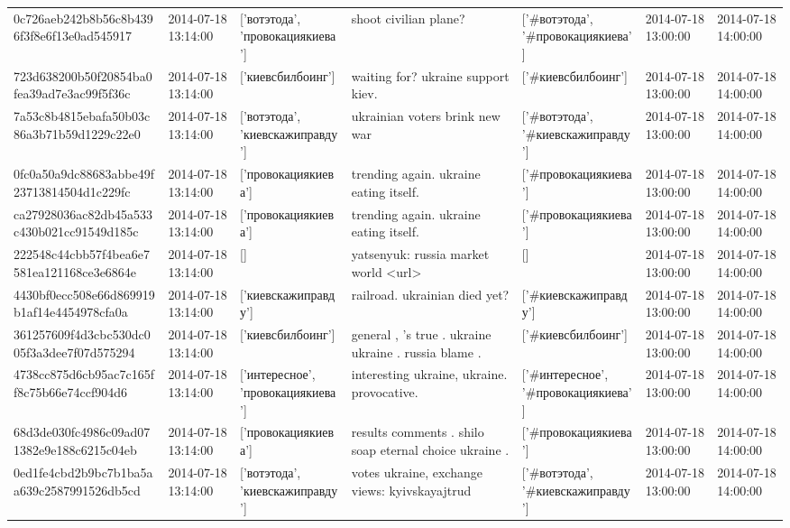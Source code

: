 \begin{tabular}{lllllll}
0c726aeb242b8b56c8b4396f3f8e6f13e0ad545917 & 2014-07-18 13:14:00 & ['вотэтода', 'провокациякиева'] & shoot civilian plane? & ['#вотэтода', '#провокациякиева'] & 2014-07-18 13:00:00 & 2014-07-18 14:00:00 \\
723d638200b50f20854ba0fea39ad7e3ac99f5f36c & 2014-07-18 13:14:00 & ['киевсбилбоинг'] & waiting for? ukraine support kiev. & ['#киевсбилбоинг'] & 2014-07-18 13:00:00 & 2014-07-18 14:00:00 \\
7a53c8b4815ebafa50b03c86a3b71b59d1229c22e0 & 2014-07-18 13:14:00 & ['вотэтода', 'киевскажиправду'] & ukrainian voters brink new war & ['#вотэтода', '#киевскажиправду'] & 2014-07-18 13:00:00 & 2014-07-18 14:00:00 \\
0fc0a50a9dc88683abbe49f23713814504d1c229fc & 2014-07-18 13:14:00 & ['провокациякиева'] & trending again. ukraine eating itself. & ['#провокациякиева'] & 2014-07-18 13:00:00 & 2014-07-18 14:00:00 \\
ca27928036ac82db45a533c430b021cc91549d185c & 2014-07-18 13:14:00 & ['провокациякиева'] & trending again. ukraine eating itself. & ['#провокациякиева'] & 2014-07-18 13:00:00 & 2014-07-18 14:00:00 \\
222548c44cbb57f4bea6e7581ea121168ce3e6864e & 2014-07-18 13:14:00 & [] & yatsenyuk: russia market world <url> & [] & 2014-07-18 13:00:00 & 2014-07-18 14:00:00 \\
4430bf0ecc508e66d869919b1af14e4454978cfa0a & 2014-07-18 13:14:00 & ['киевскажиправду'] & railroad. ukrainian died yet? & ['#киевскажиправду'] & 2014-07-18 13:00:00 & 2014-07-18 14:00:00 \\
361257609f4d3cbc530dc005f3a3dee7f07d575294 & 2014-07-18 13:14:00 & ['киевсбилбоинг'] & general , 's true . ukraine ukraine . russia blame . & ['#киевсбилбоинг'] & 2014-07-18 13:00:00 & 2014-07-18 14:00:00 \\
4738cc875d6cb95ac7c165ff8c75b66e74ccf904d6 & 2014-07-18 13:14:00 & ['интересное', 'провокациякиева'] & interesting ukraine, ukraine. provocative. & ['#интересное', '#провокациякиева'] & 2014-07-18 13:00:00 & 2014-07-18 14:00:00 \\
68d3de030fc4986c09ad071382e9e188c6215c04eb & 2014-07-18 13:14:00 & ['провокациякиева'] & results comments . shilo soap eternal choice ukraine . & ['#провокациякиева'] & 2014-07-18 13:00:00 & 2014-07-18 14:00:00 \\
0ed1fe4cbd2b9bc7b1ba5aa639c2587991526db5cd & 2014-07-18 13:14:00 & ['вотэтода', 'киевскажиправду'] & votes ukraine, exchange views: kyivskayajtrud & ['#вотэтода', '#киевскажиправду'] & 2014-07-18 13:00:00 & 2014-07-18 14:00:00 \\

\end{tabular}
